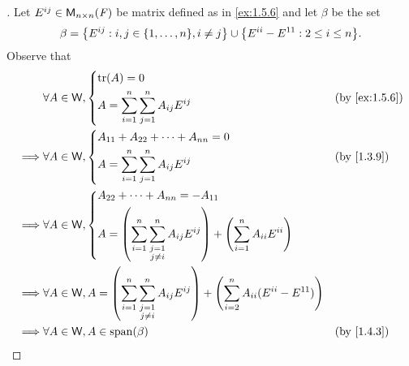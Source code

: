 \begin{proof}[]
	Let \(E^{i j} \in \ms[n][n][\F]\) be matrix defined as in \cref{ex:1.5.6} and let \(\beta\) be the set
	\[
		\beta = \set{E^{i j} : i, j \in \set{1, \dots, n}, i \neq j} \cup \set{E^{i i} - E^{1 1} : 2 \leq i \leq n}.
	\]
	Observe that
	\begin{align*}
		         & \forall A \in \W, \begin{dcases}
			                             \tr[A] = 0 \\
			                             A = \sum_{i = 1}^n \sum_{j = 1}^n A_{i j} E^{i j}
		                             \end{dcases}                                                                                                                                                                         &  & \by{ex:1.5.6}                  \\
		\implies & \forall A \in \W, \begin{dcases}
			                             A_{1 1} + A_{2 2} + \cdots + A_{n n} = 0 \\
			                             A = \sum_{i = 1}^n \sum_{j = 1}^n A_{i j} E^{i j}
		                             \end{dcases}                                                                                                                                                                         &  & \by{1.3.9}                     \\
		\implies & \forall A \in \W, \begin{dcases}
			                             A_{2 2} + \cdots + A_{n n} = -A_{1 1}        \\
			                             A = \pa{\sum_{i = 1}^n \sum_{\substack{j = 1 \\ j \neq i}}^n A_{i j} E^{i j}} + \pa{\sum_{i = 1}^n A_{i i} E^{i i}}
		                             \end{dcases} \\
		\implies & \forall A \in \W, A = \pa{\sum_{i = 1}^n \sum_{\substack{j = 1                                                                                                                                                                             \\ j \neq i}}^n A_{i j} E^{i j}} + \pa{\sum_{i = 2}^n A_{i i} (E^{i i} - E^{1 1})} \\
		\implies & \forall A \in \W, A \in \spn{\beta}                                                                                                                                                                                       &  & \by{1.4.3}  \\

\end{align*}
\end{proof}
